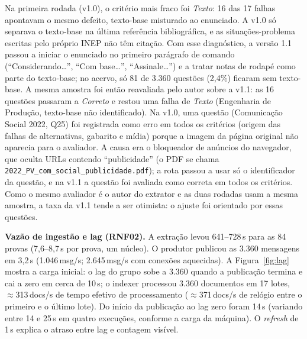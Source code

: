 \documentclass[12pt]{article}
\newcommand{\cod}[1]{\texttt{\small #1}}
\begin{document}
Na primeira rodada (v1.0), o critério mais fraco foi \emph{Texto}: 16 das 17 falhas apontavam o mesmo defeito,
texto-base misturado ao enunciado. A v1.0 só separava o texto-base na última referência bibliográfica, e as
situações-problema escritas pelo próprio INEP não têm citação. Com esse diagnóstico, a versão 1.1 passou a
iniciar o enunciado no primeiro parágrafo de comando (``Considerando…'', ``Com base…'', ``Assinale…'') e a
tratar notas de rodapé como parte do texto-base; no acervo, só 81 de 3.360 questões (2,4\%) ficaram sem
texto-base. A mesma amostra foi então reavaliada pelo autor sobre a v1.1: as 16 questões passaram a
\emph{Correto} e restou uma falha de \emph{Texto} (Engenharia de Produção, texto-base não identificado).
Na v1.0, uma questão (Comunicação Social 2022, Q25) foi registrada como erro em todos os critérios (origem das falhas de alternativas, gabarito e mídia) porque a imagem da página original não aparecia para o avaliador. A causa era o bloqueador de anúncios do navegador, que oculta URLs contendo ``publicidade'' (o PDF se chama \cod{2022\_PV\_com\_social\_publicidade.pdf}); a rota passou a usar só o identificador da questão, e na v1.1 a questão foi avaliada como correta em todos os critérios. Como o mesmo avaliador é o autor do extrator e as duas rodadas usam
a mesma amostra, a taxa da v1.1 tende a ser otimista: o ajuste foi orientado por essas questões.

\textbf{Vazão de ingestão e lag (RNF02).} A extração levou 641--728\,s para as 84 provas (7,6--8,7\,s por
prova, um núcleo). O produtor publicou as 3.360 mensagens em 3,2\,s (1.046\,msg/s; 2.645\,msg/s com conexões
aquecidas). A Figura~\ref{fig:lag} mostra a carga inicial: o lag do grupo sobe a 3.360 quando a publicação
termina e cai a zero em cerca de 10\,s; o indexer processou 3.360 documentos em 17 lotes, $\approx$313\,docs/s de tempo
efetivo de processamento ($\approx$371\,docs/s de relógio entre o primeiro e o último lote). Do início da publicação ao
lag zero foram 14\,s (variando entre 14 e 25\,s em quatro execuções, conforme a carga da máquina). O
\textit{refresh} de 1\,s explica o atraso entre lag e contagem visível.
\end{document}
